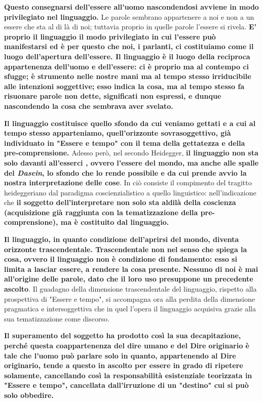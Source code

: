 \textbf{Questo consegnarsi dell'essere all'uomo nascondendosi avviene in modo privilegiato
nel linguaggio.}
Le parole sembrano appartenere a noi e non a un
essere che sta al di là di noi; tuttavia proprio in
quelle parole l'essere si rivela.\textbf{ E' proprio il linguaggio
il modo privilegiato in cui l'essere può manifestarsi
ed è per questo che noi, i parlanti, ci
costituiamo come il luogo dell'apertura
dell'essere.
Il linguaggio è il luogo della reciproca appartenenza dell'uomo e dell'essere: ci è proprio ma
al contempo ci sfugge; è strumento nelle
nostre mani ma al tempo stesso irriducibile alle
intenzioni soggettive; esso indica la cosa, ma
al tempo stesso fa risuonare parole non dette,
significati non espressi, e dunque nascondendo
la cosa che sembrava aver svelato.}

\textbf{Il linguaggio costituisce quello sfondo da cui
veniamo gettati e a cui al tempo stesso
apparteniamo, quell'orizzonte sovrasoggettivo,
già individuato in "Essere e tempo" con
il tema della gettatezza e della 
pre-comprensione.}
Adesso però, nel secondo Heidegger, \textbf{il linguaggio
non sta solo davanti all'esserci , ovvero
l'essere del mondo, ma anche alle spalle del
\textit{Dasein}, lo sfondo che lo rende possibile e da cui
prende avvio la nostra interpretazione delle cose}.
In ciò consiste il compimento del tragitto
heideggeriano dal paradigma coscienzialistico a quello
linguistico: nell'indicazione che \textbf{il soggetto dell'interpretare non solo sta aldilà della
coscienza (acquisizione già raggiunta con la
tematizzazione della pre-comprensione), ma
è costituito dal linguaggio.}


\textbf{Il linguaggio,
in quanto condizione dell'aprirsi del mondo,
diventa orizzonte trascendentale.
Trascendentale non nel senso che spiega la cosa, ovvero il linguaggio
non è condizione di fondamento:
esso si limita a lasciar essere, a
rendere la cosa presente.}
\textbf{Nessuno di noi è mai all'origine delle parole,
dato che il loro uso presuppone un precedente
ascolto}. Il guadagno della dimensione
trascendentale del linguaggio, rispetto alla
prospettiva di "Essere e tempo", si accompagna
ora alla perdita della dimensione pragmatica
e intersoggettiva che in quel l'opera il linguaggio
acquisiva grazie alla sua tematizzazione come
discorso.

\textbf{Il superamento del soggetto ha prodotto così la
sua decapitazione, perché questa coappartenenza
del dire umano e del Dire originario è
tale che l'uomo può parlare solo in quanto,
appartenendo al Dire originario, tende
a questo in ascolto per essere in grado
di ripetere solamente, cancellando così
la responsabilità esistenziale teorizzata in
"Essere e tempo", cancellata dall'irruzione
di un "destino" cui si può solo obbedire.}

